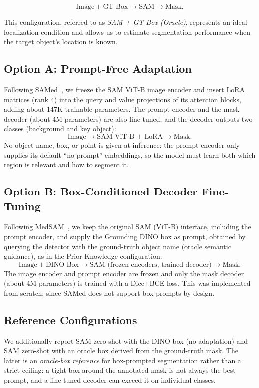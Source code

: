 \documentclass[conference]{IEEEtran}
\begin{document}
\begin{equation*}
\text{Image} + \text{GT Box} \rightarrow
\text{SAM} \rightarrow
\text{Mask}.
\end{equation*}

This configuration, referred to as \textit{SAM + GT Box (Oracle)}, represents an ideal localization condition and allows us to estimate segmentation performance when the target object's location is known.


\subsection{Option A: Prompt-Free Adaptation}
Following SAMed~\cite{samed}, we freeze the SAM ViT-B image encoder and insert LoRA~\cite{lora} matrices (rank 4) into the query and value projections of its attention blocks, adding about 147K trainable parameters. The prompt encoder and the mask decoder (about 4M parameters) are also fine-tuned, and the decoder outputs two classes (background and key object):
\begin{equation*}
\text{Image} \rightarrow \text{SAM ViT-B + LoRA} \rightarrow \text{Mask}.
\end{equation*}
No object name, box, or point is given at inference: the prompt encoder only supplies its default ``no prompt'' embeddings, so the model must learn both which region is relevant and how to segment it.

\subsection{Option B: Box-Conditioned Decoder Fine-Tuning}
Following MedSAM~\cite{medsam}, we keep the original SAM (ViT-B) interface, including the prompt encoder, and supply the Grounding DINO box as prompt, obtained by querying the detector with the ground-truth object name (oracle semantic guidance), as in the Prior Knowledge configuration:
\begin{equation*}
\text{Image} + \text{DINO Box} \rightarrow \text{SAM (frozen encoders, trained decoder)} \rightarrow \text{Mask}.
\end{equation*}
The image encoder and prompt encoder are frozen and only the mask decoder (about 4M parameters) is trained with a Dice+BCE loss. This was implemented from scratch, since SAMed does not support box prompts by design.

\subsection{Reference Configurations}
We additionally report SAM zero-shot with the DINO box (no adaptation) and SAM zero-shot with an oracle box derived from the ground-truth mask. The latter is an \emph{oracle-box reference} for box-prompted segmentation rather than a strict ceiling: a tight box around the annotated mask is not always the best prompt, and a fine-tuned decoder can exceed it on individual classes.
\end{document}
